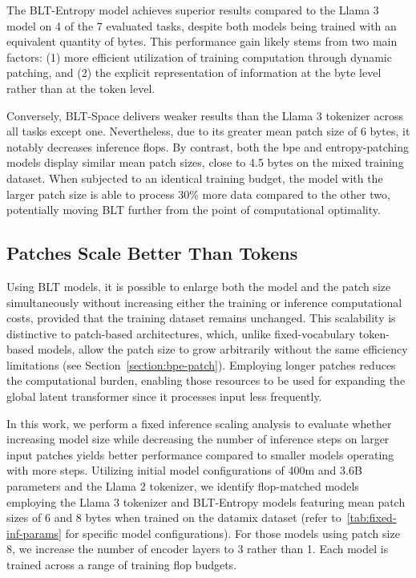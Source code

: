 The {\textsc BLT}-Entropy model achieves superior results compared to the Llama 3 model on 4 of the 7 evaluated tasks, despite both models being trained with an equivalent quantity of bytes. This performance gain likely stems from two main factors: (1) more efficient utilization of training computation through dynamic patching, and (2) the explicit representation of information at the byte level rather than at the token level.

Conversely, {\textsc BLT}-Space delivers weaker results than the Llama 3 tokenizer across all tasks except one. Nevertheless, due to its greater mean patch size of 6 bytes, it notably decreases inference flops. By contrast, both the bpe and entropy-patching models display similar mean patch sizes, close to 4.5 bytes on the mixed training dataset. When subjected to an identical training budget, the model with the larger patch size is able to process 30\% more data compared to the other two, potentially moving {\textsc BLT} further from the point of computational optimality.

\subsection{Patches Scale Better Than Tokens} Using {\textsc BLT} models, it is possible to enlarge both the model and the patch size simultaneously without increasing either the training or inference computational costs, provided that the training dataset remains unchanged. This scalability is distinctive to patch-based architectures, which, unlike fixed-vocabulary token-based models, allow the patch size to grow arbitrarily without the same efficiency limitations (see Section~\ref{section:bpe-patch}). Employing longer patches reduces the computational burden, enabling those resources to be used for expanding the global latent transformer since it processes input less frequently.

In this work, we perform a fixed inference scaling analysis to evaluate whether increasing model size while decreasing the number of inference steps on larger input patches yields better performance compared to smaller models operating with more steps. Utilizing initial model configurations of 400m and 3.6B parameters and the Llama 2 tokenizer, we identify flop-matched models employing the Llama 3 tokenizer and {\textsc BLT}-Entropy models featuring mean patch sizes of 6 and 8 bytes when trained on the datamix dataset (refer to~\autoref{tab:fixed-inf-params} for specific model configurations). For those models using patch size 8, we increase the number of encoder layers to 3 rather than 1. Each model is trained across a range of training flop budgets.


